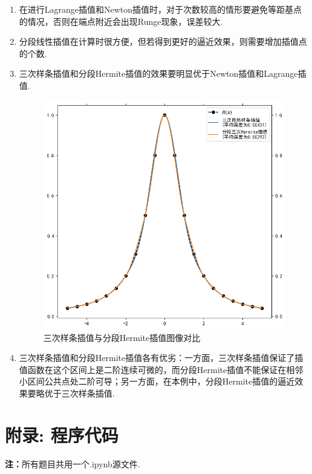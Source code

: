 \documentclass[UTF8,ctexart,a4paper,11pt,openany]{article}
\theoremstyle{definition}
\newcommand*{\rmk}{\textbf{注：}}
\begin{document}
\begin{enumerate}
    \item 在进行Lagrange插值和Newton插值时，对于次数较高的情形要避免等距基点的情况，否则在端点附近会出现Runge现象，误差较大.
    \item 分段线性插值在计算时很方便，但若得到更好的逼近效果，则需要增加插值点的个数.
    \item  三次样条插值和分段Hermite插值的效果要明显优于Newton插值和Lagrange插值.
    \begin{figure}[H]
        \centering
        \includegraphics{pics/P3.7.png}
        \caption{三次样条插值与分段Hermite插值图像对比}
        \label{graph:1}
        \end{figure}
    \item 三次样条插值和分段Hermite插值各有优劣：一方面，三次样条插值保证了插值函数在这个区间上是二阶连续可微的，而分段Hermite插值不能保证在相邻小区间公共点处二阶可导；另一方面，在本例中，分段Hermite插值的逼近效果要略优于三次样条插值.
\end{enumerate}
\clearpage

\section{附录: 程序代码}
\rmk 所有题目共用一个.ipynb源文件.
\end{document}
